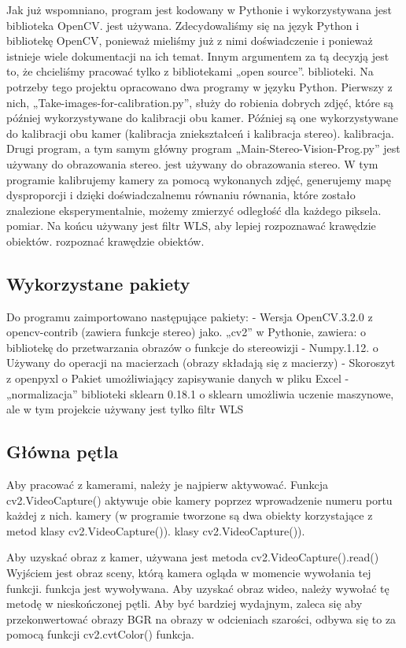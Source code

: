 \documentclass[magisterska]{pracadypl}
\begin{document}
Jak już wspomniano, program jest kodowany w Pythonie i wykorzystywana jest biblioteka OpenCV.
jest używana. Zdecydowaliśmy się na język Python i bibliotekę OpenCV, ponieważ
mieliśmy już z nimi doświadczenie i ponieważ istnieje wiele dokumentacji na ich temat. Innym
argumentem za tą decyzją jest to, że chcieliśmy pracować tylko z bibliotekami „open source”.
biblioteki.
Na potrzeby tego projektu opracowano dwa programy w języku Python.
Pierwszy z nich, „Take-images-for-calibration.py”, służy do robienia dobrych zdjęć, które są później wykorzystywane do kalibracji obu kamer.
Później są one wykorzystywane do kalibracji obu kamer (kalibracja zniekształceń i kalibracja stereo).
kalibracja.
Drugi program, a tym samym główny program „Main-Stereo-Vision-Prog.py” jest używany do obrazowania stereo.
jest używany do obrazowania stereo. W tym programie kalibrujemy kamery za pomocą wykonanych zdjęć, generujemy mapę dysproporcji i dzięki doświadczalnemu równaniu
równania, które zostało znalezione eksperymentalnie, możemy zmierzyć odległość dla każdego piksela.
pomiar. Na końcu używany jest filtr WLS, aby lepiej rozpoznawać krawędzie obiektów.
rozpoznać krawędzie obiektów.

\subsection{Wykorzystane pakiety}

Do programu zaimportowano następujące pakiety:
- Wersja OpenCV.3.2.0 z opencv-contrib (zawiera funkcje stereo) jako.
„cv2” w Pythonie, zawiera:
o bibliotekę do przetwarzania obrazów
o funkcje do stereowizji
- Numpy.1.12.
o Używany do operacji na macierzach (obrazy składają się z macierzy)
- Skoroszyt z openpyxl
o Pakiet umożliwiający zapisywanie danych w pliku Excel
- „normalizacja” biblioteki sklearn 0.18.1
o sklearn umożliwia uczenie maszynowe, ale w tym projekcie używany jest
tylko filtr WLS

\subsection{Główna pętla}

Aby pracować z kamerami, należy je najpierw aktywować. Funkcja
cv2.VideoCapture() aktywuje obie kamery poprzez wprowadzenie numeru portu każdej z nich.
kamery (w programie tworzone są dwa obiekty korzystające z metod klasy cv2.VideoCapture()).
klasy cv2.VideoCapture()).

Aby uzyskać obraz z kamer, używana jest metoda cv2.VideoCapture().read()
Wyjściem jest obraz sceny, którą kamera ogląda w momencie wywołania tej funkcji.
funkcja jest wywoływana. Aby uzyskać obraz wideo, należy wywołać tę metodę
w nieskończonej pętli. Aby być bardziej wydajnym, zaleca się
aby przekonwertować obrazy BGR na obrazy w odcieniach szarości, odbywa się to za pomocą funkcji cv2.cvtColor()
funkcja.
\end{document}
